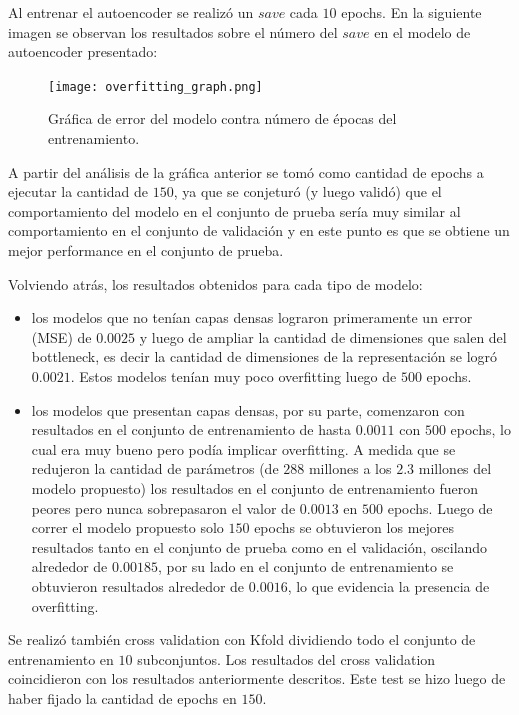 \documentclass[colorinlistoftodos,twoside,twocolumn,10pt]{article} %
\begin{document}
Al entrenar el autoencoder se realiz\'o un $save$ cada $10$ epochs. En la siguiente imagen se observan los resultados sobre el n\'umero del $save$ en el modelo de autoencoder presentado:
\begin{figure}[h!]
	\centering
		\texttt{[image: overfitting\_graph.png]}
		\caption{Gr\'afica de error del modelo contra n\'umero de \'epocas del entrenamiento.}
\end{figure}

A partir del an\'alisis de la gr\'afica anterior se tom\'o como cantidad de epochs a ejecutar la cantidad de $150$, ya que se conjetur\'o (y luego valid\'o) que el comportamiento del modelo en el conjunto de prueba ser\'ia muy similar al comportamiento en el conjunto de validaci\'on y en este punto es que se obtiene un mejor performance en el conjunto de prueba. 

Volviendo atr\'as, los resultados obtenidos para cada tipo de modelo:
\begin{itemize}
	\item los modelos que no ten\'ian capas densas lograron primeramente un error (MSE) de $0.0025$ y luego de ampliar la   cantidad de dimensiones que salen del bottleneck, es decir la cantidad de dimensiones de la representaci\'on se logr\'o $0.0021$. Estos modelos ten\'ian muy poco overfitting luego de $500$ epochs.
	\item los modelos que presentan capas densas, por su parte, comenzaron con resultados en el conjunto de entrenamiento de hasta $0.0011$ con $500$ epochs, lo cual era muy bueno pero pod\'ia implicar overfitting. A medida que se redujeron la cantidad de par\'ametros (de $288$ millones a los $2.3$ millones del modelo propuesto) los resultados en el conjunto de entrenamiento fueron peores pero nunca sobrepasaron el valor de $0.0013$ en $500$ epochs. Luego de correr el modelo propuesto solo $150$ epochs se obtuvieron los mejores resultados tanto en el conjunto de prueba como en el validaci\'on, oscilando alrededor de $0.00185$, por su lado en el conjunto de entrenamiento se obtuvieron resultados alrededor de $0.0016$, lo que evidencia la presencia de overfitting.
\end{itemize}

Se realiz\'o tambi\'en cross validation con Kfold dividiendo todo el conjunto de entrenamiento en $10$ subconjuntos. Los resultados del cross validation coincidieron con los resultados anteriormente descritos. Este test se hizo luego de haber fijado la cantidad de epochs en $150$.
\end{document}
